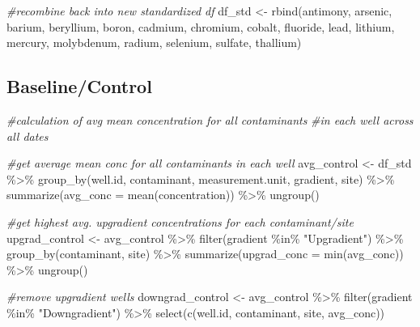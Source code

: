 \documentclass[12pt, twoside]{amherstthesis}
\newenvironment{Shaded}{\begin{snugshade}}{\end{snugshade}}
\newcommand{\AttributeTok}[1]{\textcolor[rgb]{0.77,0.63,0.00}{#1}}
\newcommand{\CommentTok}[1]{\textcolor[rgb]{0.56,0.35,0.01}{\textit{#1}}}
\newcommand{\FunctionTok}[1]{\textcolor[rgb]{0.00,0.00,0.00}{#1}}
\newcommand{\NormalTok}[1]{#1}
\newcommand{\OtherTok}[1]{\textcolor[rgb]{0.56,0.35,0.01}{#1}}
\newcommand{\SpecialCharTok}[1]{\textcolor[rgb]{0.00,0.00,0.00}{#1}}
\newcommand{\StringTok}[1]{\textcolor[rgb]{0.31,0.60,0.02}{#1}}
\begin{document}
\begin{Shaded}
\begin{Highlighting}[]
\CommentTok{\#recombine back into new standardized df}
\NormalTok{df\_std }\OtherTok{\textless{}{-}} \FunctionTok{rbind}\NormalTok{(antimony, arsenic, barium, beryllium, boron, cadmium,}
\NormalTok{                chromium, cobalt, fluoride, lead, lithium, mercury, }
\NormalTok{                molybdenum, radium, selenium, sulfate, thallium)}
\end{Highlighting}
\end{Shaded}
\hypertarget{baselinecontrol}{%
\subsection{Baseline/Control}\label{baselinecontrol}}
\begin{Shaded}
\begin{Highlighting}[]
\CommentTok{\#calculation of avg mean concentration for all contaminants }
\CommentTok{\#in each well across all dates}

\CommentTok{\#get average mean conc for all contaminants in each well}
\NormalTok{avg\_control }\OtherTok{\textless{}{-}}\NormalTok{ df\_std }\SpecialCharTok{\%\textgreater{}\%}
  \FunctionTok{group\_by}\NormalTok{(well.id, contaminant, measurement.unit, gradient, site) }\SpecialCharTok{\%\textgreater{}\%}
  \FunctionTok{summarize}\NormalTok{(}\AttributeTok{avg\_conc =} \FunctionTok{mean}\NormalTok{(concentration)) }\SpecialCharTok{\%\textgreater{}\%}
  \FunctionTok{ungroup}\NormalTok{()}

\CommentTok{\#get highest avg. upgradient concentrations for each contaminant/site}
\NormalTok{upgrad\_control }\OtherTok{\textless{}{-}}\NormalTok{ avg\_control }\SpecialCharTok{\%\textgreater{}\%}
  \FunctionTok{filter}\NormalTok{(gradient }\SpecialCharTok{\%in\%} \StringTok{"Upgradient"}\NormalTok{) }\SpecialCharTok{\%\textgreater{}\%}
  \FunctionTok{group\_by}\NormalTok{(contaminant, site) }\SpecialCharTok{\%\textgreater{}\%}
  \FunctionTok{summarize}\NormalTok{(}\AttributeTok{upgrad\_conc =} \FunctionTok{min}\NormalTok{(avg\_conc)) }\SpecialCharTok{\%\textgreater{}\%}
  \FunctionTok{ungroup}\NormalTok{()}

\CommentTok{\#remove upgradient wells}
\NormalTok{downgrad\_control }\OtherTok{\textless{}{-}}\NormalTok{ avg\_control }\SpecialCharTok{\%\textgreater{}\%}
  \FunctionTok{filter}\NormalTok{(gradient }\SpecialCharTok{\%in\%} \StringTok{"Downgradient"}\NormalTok{) }\SpecialCharTok{\%\textgreater{}\%}
  \FunctionTok{select}\NormalTok{(}\FunctionTok{c}\NormalTok{(well.id, contaminant, site, avg\_conc))}


\end{Highlighting}
\end{Shaded}
\end{document}
